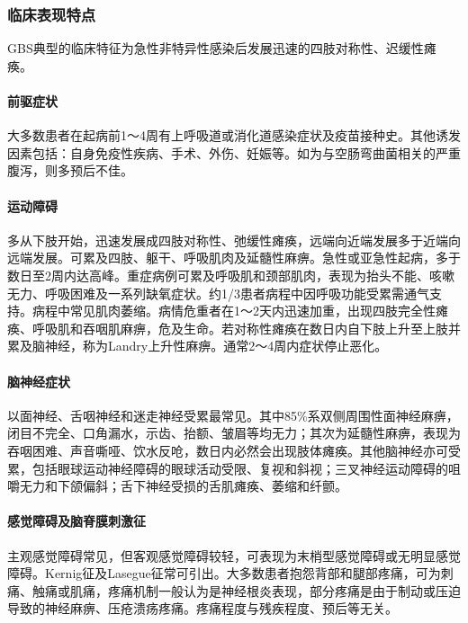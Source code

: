 \subsubsection{临床表现特点}

GBS典型的临床特征为急性非特异性感染后发展迅速的四肢对称性、迟缓性瘫痪。

\paragraph{前驱症状}

大多数患者在起病前1～4周有上呼吸道或消化道感染症状及疫苗接种史。其他诱发因素包括：自身免疫性疾病、手术、外伤、妊娠等。如为与空肠弯曲菌相关的严重腹泻，则多预后不佳。

\paragraph{运动障碍}

多从下肢开始，迅速发展成四肢对称性、弛缓性瘫痪，远端向近端发展多于近端向远端发展。可累及四肢、躯干、呼吸肌肉及延髓性麻痹。急性或亚急性起病，多于数日至2周内达高峰。重症病例可累及呼吸肌和颈部肌肉，表现为抬头不能、咳嗽无力、呼吸困难及一系列缺氧症状。约1/3患者病程中因呼吸功能受累需通气支持。病程中常见肌肉萎缩。病情危重者在1～2天内迅速加重，出现四肢完全性瘫痪、呼吸肌和吞咽肌麻痹，危及生命。若对称性瘫痪在数日内自下肢上升至上肢并累及脑神经，称为Landry上升性麻痹。通常2～4周内症状停止恶化。

\paragraph{脑神经症状}

以面神经、舌咽神经和迷走神经受累最常见。其中85\%系双侧周围性面神经麻痹，闭目不完全、口角漏水，示齿、抬额、皱眉等均无力；其次为延髓性麻痹，表现为吞咽困难、声音嘶哑、饮水反呛，数日内必然会出现肢体瘫痪。其他脑神经亦可受累，包括眼球运动神经障碍的眼球活动受限、复视和斜视；三叉神经运动障碍的咀嚼无力和下颌偏斜；舌下神经受损的舌肌瘫痪、萎缩和纤颤。

\paragraph{感觉障碍及脑脊膜刺激征}

主观感觉障碍常见，但客观感觉障碍较轻，可表现为末梢型感觉障碍或无明显感觉障碍。Kernig征及Lasegue征常可引出。大多数患者抱怨背部和腿部疼痛，可为刺痛、触痛或肌痛，疼痛机制一般认为是神经根炎表现，部分疼痛是由于制动或压迫导致的神经麻痹、压疮溃疡疼痛。疼痛程度与残疾程度、预后等无关。

